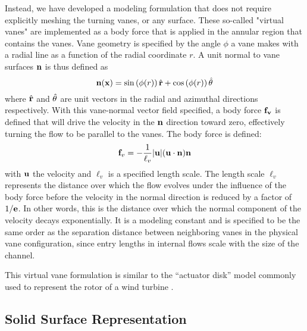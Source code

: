 
Instead, we have developed a modeling formulation that does not require
explicitly meshing the turning vanes, or any surface. These so-called
"virtual vanes" are implemented as a body force that 
is applied in the annular region that contains the vanes. Vane
geometry is specified by the angle $\phi$ a vane makes with a radial
line as a function of the radial coordinate $r$. A unit normal to vane
surfaces ${\bf n}$ is thus defined as
%
\begin{equation}
 {\bf n}({\bf x}) = \sin \left(\phi(r) \right) \hat{{\bf r}}+ \cos \left(\phi(r) \right) \hat{{\bf \theta}}
\end{equation}
%
where $\hat{{\bf r}}$ and $\hat{{\bf \theta}}$ are unit
vectors in the radial and azimuthal directions respectively.
With this vane-normal vector field specified, a body force ${\bf f_v}$
is defined
that will drive the velocity in the ${\bf n}$ direction toward zero,
effectively turning the flow to be parallel to the vanes. The body
force is defined:
\begin{equation}
 {\bf f}_v= -\frac{1}{\ell_v}|{\bf u}|({\bf u}\cdot{\bf n}){\bf n}
 \label{eqn:body_force}
\end{equation}
with ${\bf u}$ the velocity and $\ell_v$ is a specified length
scale. The length scale $\ell_v$ represents the distance over which the
flow evolves under the influence of the body force before the
velocity in the normal direction is reduced by a factor of $1/{\bf
e}$. In other words, this is the distance over which the
normal component of the velocity decays exponentially.
It is a modeling constant and is specified to be
the same order as the separation distance between neighboring vanes in
the physical vane configuration, since entry lengths in internal flows
scale with the size of the channel.

This virtual vane formulation is similar to the ``actuator disk'' model
commonly used to represent the rotor of a wind turbine \cite{betz}.


\subsection{Solid Surface Representation}
\label{subsec:solid_surface}

